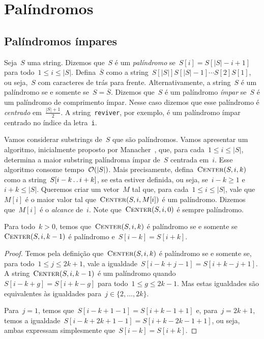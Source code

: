 \chapter{Palíndromos} \label{chap:manacher}

\section{Palíndromos ímpares}
Seja~$S$ uma string. Dizemos que~$S$ é um \emph{palíndromo} se~${S[i] = S[|S| - i + 1]}$ para todo~${1 \leq i \leq |S|}$. Defina~$\overline{S}$ como a string~${S[|S|]S[|S|-1]\cdots S[2]S[1]}$, ou seja,~$S$ com caracteres de trás para frente. Alternativamente, a string~$S$ é um palíndromo se e somente se~$S = \overline{S}$. Dizemos que~$S$ é um palíndromo \emph{ímpar} se~$S$ é um palíndromo de comprimento ímpar. Nesse caso dizemos que esse palíndromo é \emph{centrado} em~$\frac{|S| + 1}{2}$. A string~\texttt{reviver}, por exemplo, é um palíndromo ímpar centrado no índice da letra~\texttt{i}.

Vamos considerar substrings de~$S$ que são palíndromos. Vamos apresentar um algoritmo, inicialmente proposto por Manacher~\cite{manacher}, que, para cada~${1 \leq i \leq |S|}$, determina a maior substring palíndroma ímpar de~$S$ centrada em~$i$. Esse algoritmo consome tempo~$\mathcal{O}(|S|)$. Mais precisamente, defina~${\textsc{Center}(S, i, k)}$ como a string~${S[i-k\,.\,.\, i+k]}$, se esta estiver definida, ou seja, se~${i-k \geq 1}$ e~$i+k \leq |S|$. Queremos criar um vetor~$M$ tal que, para cada~${1 \leq i \leq |S|}$, vale que~$M[i]$ é o maior valor tal que~${\textsc{Center}(S, i, M[i])}$ é um palíndromo. Dizemos que~$M[i]$ é o \emph{alcance} de~$i$.
Note que~${\textsc{Center}(S, i, 0)}$ é sempre palíndromo.

\begin{prop}
\label{prop:palcenter}
Para todo~${k > 0}$, temos que~$\textsc{Center}(S, i, k)$ é palíndromo se e somente se~$\textsc{Center}(S, i, k - 1)$ é palíndromo e~${S[i - k] = S[i + k]}$.
\end{prop}

\begin{proof}
Temos pela definição que~$\textsc{Center}(S, i, k)$ é palíndromo se e somente se, para todo~${1 \leq j \leq 2k+1}$, vale a igualdade~${S[i - k + j - 1] = S[i + k - j + 1]}$. A string~${\textsc{Center}(S, i, k-1)}$ é um palíndromo quando~${S[i - k + g] = S[i + k - g]}$ para todo~${1 \leq g \leq 2k-1}$. Mas estas igualdades são equivalentes às igualdades para~${j \in \{2, \ldots, 2k\}}$.

Para~${j = 1}$, temos que~${S[i - k + 1 - 1] = S[i + k - 1 + 1]}$ e, para~${j = 2k+1}$, temos a igualdade~${S[i - k + 2k + 1 - 1] = S[i + k - 2k - 1 + 1]}$, ou seja, ambas expressam simplesmente que~${S[i - k] = S[i + k]}$.
\end{proof}

